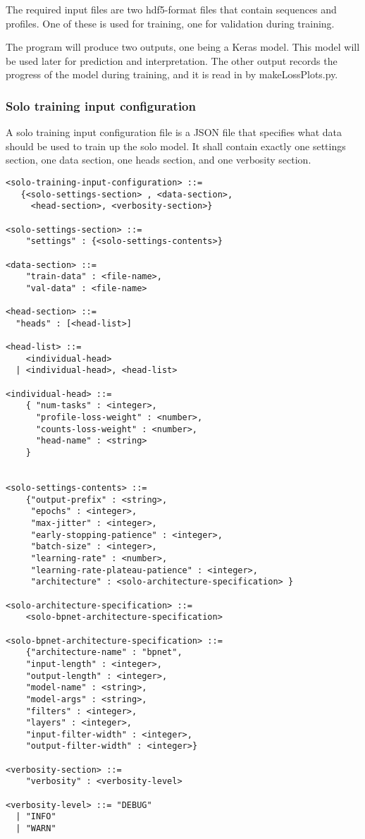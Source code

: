 \documentclass{article}
\begin{document}
The required input files are two hdf5-format files that contain sequences and profiles. One of these is used for training, one for validation during training. 

The program will produce two outputs, one being a Keras model. This model will be used later for prediction and interpretation. The other output records the progress of the model during training, and it is read in by makeLossPlots.py. 


\subsubsection{Solo training input configuration}
A solo training input configuration file is a JSON file that specifies what data should be used to train up the solo model.
It shall contain exactly one settings section, one data section, one heads section, and one verbosity section. 

\begin{lstlisting}
<solo-training-input-configuration> ::= 
   {<solo-settings-section> , <data-section>, 
     <head-section>, <verbosity-section>}

<solo-settings-section> ::= 
    "settings" : {<solo-settings-contents>}

<data-section> ::= 
    "train-data" : <file-name>,
    "val-data" : <file-name>

<head-section> ::= 
  "heads" : [<head-list>]

<head-list> ::= 
    <individual-head>
  | <individual-head>, <head-list>

<individual-head> ::=
    { "num-tasks" : <integer>,
      "profile-loss-weight" : <number>,
      "counts-loss-weight" : <number>,
      "head-name" : <string>
    }


<solo-settings-contents> ::= 
    {"output-prefix" : <string>, 
     "epochs" : <integer>, 
     "max-jitter" : <integer>,
     "early-stopping-patience" : <integer>, 
     "batch-size" : <integer>, 
     "learning-rate" : <number>, 
     "learning-rate-plateau-patience" : <integer>,
     "architecture" : <solo-architecture-specification> } 

<solo-architecture-specification> ::= 
    <solo-bpnet-architecture-specification>

<solo-bpnet-architecture-specification> ::= 
    {"architecture-name" : "bpnet",
    "input-length" : <integer>, 
    "output-length" : <integer>,
    "model-name" : <string>,
    "model-args" : <string>,
    "filters" : <integer>,
    "layers" : <integer>,
    "input-filter-width" : <integer>,
    "output-filter-width" : <integer>}

<verbosity-section> ::= 
    "verbosity" : <verbosity-level>

<verbosity-level> ::= "DEBUG"
  | "INFO"
  | "WARN"
\end{lstlisting}
\end{document}
